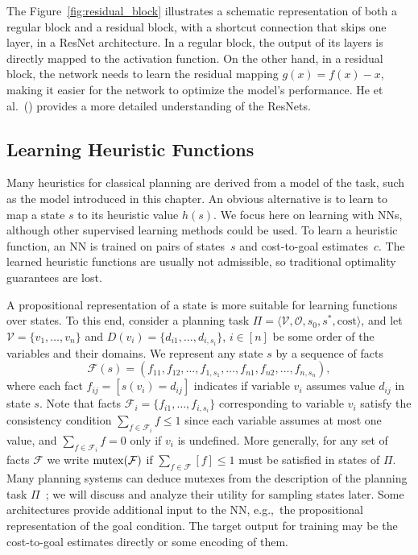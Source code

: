 The Figure~\ref{fig:residual_block} illustrates a schematic representation of both a regular block and a residual block, with a shortcut connection that skips one layer, in a ResNet architecture. In a regular block, the output of its layers is directly mapped to the activation function. On the other hand, in a residual block, the network needs to learn the residual mapping $g(x)=f(x)-x$, making it easier for the network to optimize the model's performance. He et al.~(\citeyear{He.etal/2016}) provides a more detailed understanding of the ResNets.

\subsection{Learning Heuristic Functions}
\label{sec:background_learningheuristics}

Many heuristics for classical planning are derived from a model of the task, such as the \sas model introduced in this chapter. An obvious alternative is to learn to map a state $s$ to its heuristic value $h(s)$. We focus here on learning with NNs, although other supervised learning methods could be used. To learn a heuristic function, an NN is trained on pairs of states~$s$ and cost-to-goal estimates~$c$. The learned heuristic functions are usually not admissible, so traditional optimality guarantees are lost.

A propositional representation of a state is more suitable for learning functions over states. To this end, consider a planning task $\Pi=\langle\mathcal{V},\mathcal{O},s_0,s^*, \text{cost}\rangle$, and let $\mathcal{V}=\{v_1,\ldots,v_n\}$ and $D(v_i)=\{d_{i1},\ldots,d_{i,s_i}\}$, $i\in[n]$ be some order of the variables and their domains. We represent any state $s$ by a sequence of facts $$\mathcal{F}(s)=(f_{11},f_{12},\ldots,f_{1,s_1},\ldots,f_{n1},f_{n2},\ldots,f_{n,s_n}),$$ where each fact $f_{ij}=[s(v_i)=d_{ij}]$ indicates if variable $v_i$ assumes value $d_{ij}$ in state $s$. Note that facts $\mathcal{F}_i=\{f_{i1},\ldots,f_{i,s_i}\}$ corresponding to variable $v_i$ satisfy the consistency condition $\sum_{f\in \mathcal{F}_i} f\leq 1$ since each variable assumes at most one value, and $\sum_{f\in \mathcal{F}_i} f=0$ only if $v_i$ is undefined. More generally, for any set of facts $\mathcal{F}$ we write $\operatorname{mutex}(\mathcal{F})$ if $\sum_{f\in \mathcal{F}} [f]\leq 1$ must be satisfied in states of $\Pi$. Many planning systems can deduce mutexes from the description of the planning task $\Pi$~\cite{Helmert/2009}; we will discuss and analyze their utility for sampling states later. Some architectures provide additional input to the NN, e.g.,~the propositional representation of the goal condition. The target output for training may be the cost-to-goal estimates directly or some encoding of them.

